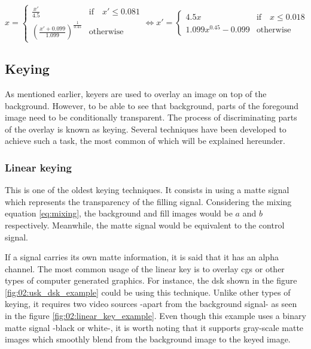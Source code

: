 \documentclass[../main.tex]{subfiles}
\begin{document}
\begin{equation} \label{eq:bt1866}
    x =
    \begin{cases}
        \frac{x'}{4.5} &\text{if} \quad x' \le 0.081 \\
        (\frac{x' + 0.099}{1.099})^{\frac{1}{0.45}} &\text{otherwise}
    \end{cases}
    \Longleftrightarrow
    x' =
    \begin{cases}
        4.5x &\text{if}\quad x \le 0.018 \\
        1.099x^{0.45} - 0.099 &\text{otherwise}
    \end{cases}
\end{equation}

\subsection{Keying}
As mentioned earlier, keyers are used to overlay an image on top of the background. However, to be able to see that background, parts of the foregound image need to be conditionally transparent. The process of discriminating parts of the overlay is known as keying. Several techniques have been developed to achieve such a task, the most common of which will be explained hereunder.\newline

\subsubsection{Linear keying}
This is one of the oldest keying techniques. It consists in using a matte signal which represents the transparency of the filling signal. Considering the mixing equation \eqref{eq:mixing}, the background and fill images would be $a$ and $b$ respectively. Meanwhile, the matte signal would be equivalent to the control signal.\newline

If a signal carries its own matte information, it is said that it has an alpha channel. The most common usage of the linear key is to overlay \glspl{cg} or other types of computer generated graphics. For instance, the \gls{dsk} shown in the figure \ref{fig:02:usk_dsk_example} could be using this technique. Unlike other types of keying, it requires two video sources -apart from the background signal- as seen in the figure \ref{fig:02:linear_key_example}. Even though this example uses a binary matte signal -black or white-, it is worth noting that it supports gray-scale matte images which smoothly blend from the background image to the keyed image.\newline
\end{document}
